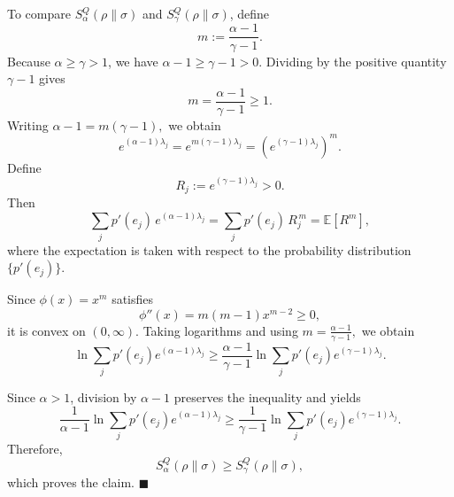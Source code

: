 \documentclass[a4paper, amsfonts, amssymb, amsmath, reprint, showkeys, nofootinbib, twoside, aps, pra]{revtex4-2}
\theoremstyle{definition}
\renewenvironment{proof}{\noindent{\bfseries Proof.}}{\hfill$\blacksquare$}
\begin{document}
\begin{proof}
To compare
$S_\alpha^Q(\rho\|\sigma)$ and $S_\gamma^Q(\rho\|\sigma)$,
define
\begin{equation}
m := \frac{\alpha-1}{\gamma-1}.
\end{equation}
Because $\alpha\ge\gamma>1$, we have $\alpha-1\ge\gamma-1>0.$ Dividing by the positive quantity $\gamma-1$ gives
\begin{equation}
m=\frac{\alpha-1}{\gamma-1}\ge1.
\end{equation}
Writing $\alpha-1=m(\gamma-1),$ we obtain
\begin{equation}
    e^{(\alpha-1)\lambda_j}=e^{m(\gamma-1)\lambda_j}=
    \left(e^{(\gamma-1)\lambda_j}\right)^m.
\end{equation}
Define
\begin{equation}
    R_j := e^{(\gamma-1)\lambda_j}>0.
\end{equation}
Then
\begin{equation}
\sum_j p'(e_j)\, e^{(\alpha-1)\lambda_j} = \sum_j p'(e_j)\, R_j^{\,m}=\mathbb E[R^m],
\end{equation}
where the expectation is taken with respect to the probability distribution
$\{p'(e_j)\}$.

Since $\phi(x)=x^m$ satisfies
\begin{equation}
    \phi''(x)=m(m-1)x^{m-2}\ge0,
\end{equation}
it is convex on $(0,\infty)$. Taking logarithms and using $m=\frac{\alpha-1}{\gamma-1},$ we obtain
\begin{equation}
\ln\sum_jp'(e_j)e^{(\alpha-1)\lambda_j}\ge \frac{\alpha-1}{\gamma-1}\ln\sum_jp'(e_j)e^{(\gamma-1)\lambda_j}.
\end{equation}

Since $\alpha>1$, division by $\alpha-1$ preserves the inequality and yields
\begin{equation}
\frac{1}{\alpha-1}\ln\sum_jp'(e_j)e^{(\alpha-1)\lambda_j}\ge\frac{1}{\gamma-1}\ln\sum_jp'(e_j)
e^{(\gamma-1)\lambda_j}.
\end{equation}
Therefore,
\begin{equation}
S_\alpha^Q(\rho\|\sigma)
\ge S_\gamma^Q(\rho\|\sigma),
\end{equation}
which proves the claim.
\end{proof}




\end{document}

